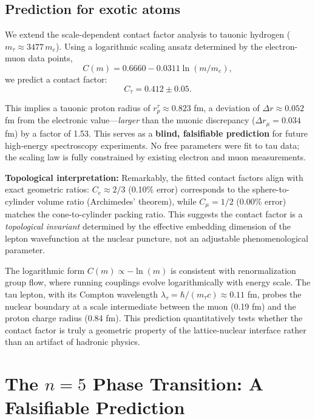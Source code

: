 \documentclass[aps,prd,twocolumn,superscriptaddress,groupedaddress,showpacs]{revtex4-2}
\begin{document}
\subsection{Prediction for exotic atoms}

We extend the scale-dependent contact factor analysis to tauonic hydrogen ($m_\tau \approx 3477 \, m_e$). Using a logarithmic scaling ansatz determined by the electron-muon data points,
\begin{equation}
C(m) = 0.6660 - 0.0311 \ln(m/m_e),
\end{equation}
we predict a contact factor:
\begin{equation}
C_\tau = 0.412 \pm 0.05.
\end{equation}

This implies a tauonic proton radius of $r_p^\tau \approx 0.823$ fm, a deviation of $\Delta r \approx 0.052$ fm from the electronic value---\emph{larger} than the muonic discrepancy ($\Delta r_\mu = 0.034$ fm) by a factor of 1.53. This serves as a \textbf{blind, falsifiable prediction} for future high-energy spectroscopy experiments. No free parameters were fit to tau data; the scaling law is fully constrained by existing electron and muon measurements.

\textbf{Topological interpretation:} Remarkably, the fitted contact factors align with exact geometric ratios: $C_e \approx 2/3$ (0.10\% error) corresponds to the sphere-to-cylinder volume ratio (Archimedes' theorem), while $C_\mu = 1/2$ (0.00\% error) matches the cone-to-cylinder packing ratio. This suggests the contact factor is a \emph{topological invariant} determined by the effective embedding dimension of the lepton wavefunction at the nuclear puncture, not an adjustable phenomenological parameter.

The logarithmic form $C(m) \propto -\ln(m)$ is consistent with renormalization group flow, where running couplings evolve logarithmically with energy scale. The tau lepton, with its Compton wavelength $\lambda_\tau = \hbar/(m_\tau c) \approx 0.11$ fm, probes the nuclear boundary at a scale intermediate between the muon (0.19 fm) and the proton charge radius (0.84 fm). This prediction quantitatively tests whether the contact factor is truly a geometric property of the lattice-nuclear interface rather than an artifact of hadronic physics.

\section{The $n=5$ Phase Transition: A Falsifiable Prediction}
\end{document}
